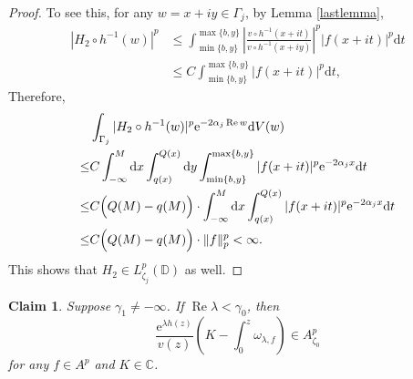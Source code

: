 \documentclass{amsart}
\theoremstyle{proclaim}
\newtheorem{claim}[theorem]{Claim}
\theoremstyle{fancyproclaim}
\theoremstyle{definition}
\theoremstyle{fancystatement}
\numberwithin{equation}{section}
\begin{document}
\begin{proof}
To see this, for any $w=x+iy\in\Gamma_j$, by Lemma \ref{lastlemma},
\begin{align*}
|H_2\circ h^{-1}(w)|^p&\leq\int_{\min\{b,y\}}^{\max\{b,y\}}\left|\frac{v\circ h^{-1}(x+it)}{v\circ h^{-1}(x+iy)}\right|^p |f(x+it)|^p\mathrm{d}t\\
&\leq C\int_{\min\{b,y\}}^{\max\{b,y\}}|f(x+it)|^p\mathrm{d}t,
\end{align*}
Therefore,
\begin{align*}
&\int_{\Gamma_j}|H_2\circ h^{-1}(w)|^p \mathrm{e}^{-2\alpha_j  \operatorname{Re}w} \mathrm{d}V(w)\\
\leq&C\int_{-\infty}^{M}\mathrm{d}x\int_{q(x)}^{Q(x)}\mathrm{d}y\int_{\min\{b,y\}}^{\max\{b,y\}}|f(x+it)|^p\mathrm{e}^{-2\alpha_jx}\mathrm{d}t\\
\leq&C\Bigl(Q(M)-q(M)\Bigr)\cdot\int_{-\infty}^{M}\mathrm{d}x\int_{q(x)}^{Q(x)}|f(x+it)|^p\mathrm{e}^{-2\alpha_jx}\mathrm{d}t\\
\leq&C\Bigl(Q(M)-q(M)\Bigr)\cdot\|f\|_p^p<\infty.
\end{align*}
This shows that $H_2\in L^p_{\zeta_j}(\mathbb{D})$ as well.
\end{proof}


\begin{claim}\label{<0}
Suppose $\gamma_1\ne-\infty$. If $ \operatorname{Re}\lambda<\gamma_0$, then 
$$\frac{ \mathrm{e}^{\lambda h(z)}}{v(z)}\left(K-\int_0^{z}\omega_{\lambda,f}\right)\in A^p_{\zeta_0}$$
for any $f\in A^p$ and $K\in\mathbb{C}$. 
\end{claim}
\end{document}
